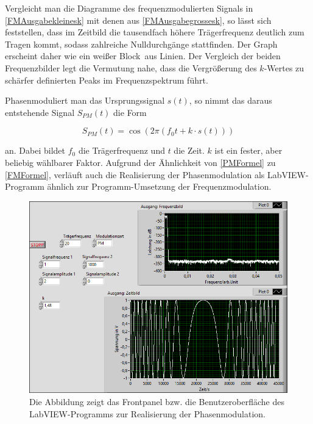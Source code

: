 \documentclass[
a4paper,
12pt,
pagesize,
ngerman
]{scrartcl}
\begin{document}
	Vergleicht man die Diagramme des frequenzmodulierten Signals in \cref{FMAusgabekleinesk} mit denen aus \cref{FMAusgabegrossesk}, so lässt sich feststellen, dass im Zeitbild die tausendfach höhere Trägerfrequenz deutlich zum Tragen kommt, sodass zahlreiche Nulldurchgänge stattfinden. 
	Der Graph erscheint daher wie ein \glqq weißer Block\grqq\ aus Linien. 
	Der Vergleich der beiden Frequenzbilder legt die Vermutung nahe, dass die Vergrößerung des $k$-Wertes zu schärfer definierten Peaks im Frequenzspektrum führt.
	
	Phasenmoduliert man das Ursprungssignal $s(t)$, so nimmt das daraus entstehende Signal $S_{PM}(t)$ die Form
	
	\begin{equation} \label{PMFormel}
	S_{PM}(t) = \cos (2\pi (f_0 t + k \cdot s(t)))
	\end{equation}
	
	\noindent an. 
	Dabei bildet $f_0$ die Trägerfrequenz und $t$ die Zeit. 
	$k$ ist ein fester, aber beliebig wählbarer Faktor. 
	Aufgrund der Ähnlichkeit von \cref{PMFormel} zu \cref{FMFormel}, verläuft auch die Realisierung der Phasenmodulation als LabVIEW-Programm ähnlich zur Programm-Umsetzung der Frequenzmodulation. 
	
	\begin{figure}[H]
		\centering
		\includegraphics[width=1.0\textwidth]{EIRE2018Dateien/Tag4/FMPM-Erzeugung/PM-FMPM-Erzeugungp}
		\caption{Die Abbildung zeigt das Frontpanel bzw. die Benutzeroberfläche des LabVIEW-Programms zur Realisierung der Phasenmodulation.}
		\label{PMAusgabe}
	\end{figure}
\end{document}
